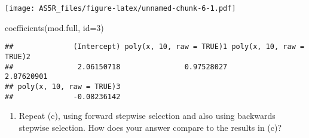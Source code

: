 \documentclass[
]{article}
\newenvironment{Shaded}{\begin{snugshade}}{\end{snugshade}}
\newcommand{\AttributeTok}[1]{\textcolor[rgb]{0.77,0.63,0.00}{#1}}
\newcommand{\CommentTok}[1]{\textcolor[rgb]{0.56,0.35,0.01}{\textit{#1}}}
\newcommand{\ConstantTok}[1]{\textcolor[rgb]{0.00,0.00,0.00}{#1}}
\newcommand{\DecValTok}[1]{\textcolor[rgb]{0.00,0.00,0.81}{#1}}
\newcommand{\FunctionTok}[1]{\textcolor[rgb]{0.00,0.00,0.00}{#1}}
\newcommand{\NormalTok}[1]{#1}
\newcommand{\OtherTok}[1]{\textcolor[rgb]{0.56,0.35,0.01}{#1}}
\newcommand{\SpecialCharTok}[1]{\textcolor[rgb]{0.00,0.00,0.00}{#1}}
\newcommand{\StringTok}[1]{\textcolor[rgb]{0.31,0.60,0.02}{#1}}
\providecommand{\tightlist}{%
  \setlength{\itemsep}{0pt}\setlength{\parskip}{0pt}}
\begin{document}
\texttt{[image: AS5R\_files/figure-latex/unnamed-chunk-6-1.pdf]}

\begin{Shaded}
\begin{Highlighting}[]
\FunctionTok{coefficients}\NormalTok{(mod.full, }\AttributeTok{id=}\DecValTok{3}\NormalTok{)}
\end{Highlighting}
\end{Shaded}

\begin{verbatim}
##              (Intercept) poly(x, 10, raw = TRUE)1 poly(x, 10, raw = TRUE)2 
##               2.06150718               0.97528027               2.87620901 
## poly(x, 10, raw = TRUE)3 
##              -0.08236142
\end{verbatim}

\begin{enumerate}
\def\labelenumi{(\alph{enumi})}
\setcounter{enumi}{3}
\tightlist
\item
  Repeat (c), using forward stepwise selection and also using backwards
  stepwise selection. How does your answer compare to the results in
  (c)?
\end{enumerate}

\begin{Shaded}
\end{Shaded}
\end{document}
